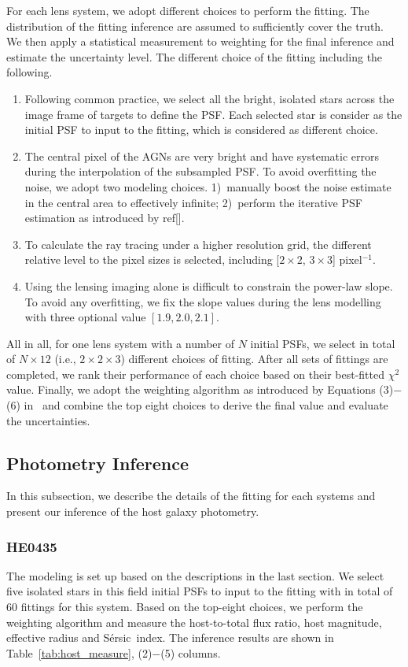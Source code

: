 \documentclass[fleqn,usenatbib]{mnras}
\newcommand{\sersic}{S\'ersic}
\begin{document}
For each lens system, we adopt different choices to perform the fitting. The distribution of the fitting inference are assumed to sufficiently cover the truth. We then apply a statistical measurement to weighting for the final inference and estimate the uncertainty level. The different choice of the fitting including the following.
\begin{enumerate}
\item Following common practice, we select all the bright, isolated stars across the image frame of targets to define the PSF. Each selected star is consider as the initial PSF to input to the fitting, which is considered as different choice.
\item The central pixel of the AGNs are very bright and have systematic errors during the interpolation of the subsampled PSF. To avoid overfitting the noise, we adopt two modeling choices. 1)~manually boost the noise estimate in the central area to effectively infinite; 2)~perform the iterative PSF estimation as introduced by ref[].
\item To calculate the ray tracing under a higher resolution grid, the different relative level to the pixel sizes is selected, including [$2\times2$, $3\times3$] pixel$^{-1}$.
\item Using the lensing imaging alone is difficult to constrain the power-law slope. To avoid any overfitting, we fix the slope values during the lens modelling with three optional value $[1.9, 2.0, 2.1]$.
\end{enumerate}

All in all, for one lens system with a number of $N$ initial PSFs, we select in total of $N\times12$ (i.e., $2 \times2 \times3$) different choices of fitting. After  all sets of fittings are completed, we rank their performance of each choice based on their best-fitted $\chi^2$ value. Finally, we adopt the weighting algorithm as introduced by Equations (3)$-$(6) in~\citet{Ding2020} and combine the top eight choices to derive the final value and evaluate the uncertainties.

\subsection{Photometry Inference}
In this subsection, we describe the details of the fitting for each systems and present our inference of the host galaxy photometry.

\subsubsection{HE0435}
The modeling is set up based on the descriptions in the last section. We select five isolated stars in this field initial PSFs to input to the fitting with in total of 60 fittings for this system. Based on the top-eight choices, we perform the weighting algorithm and measure the host-to-total flux ratio, host magnitude, effective radius and \sersic\ index. The inference results are shown in Table~\ref{tab:host_measure}, (2)$-$(5) columns.
\end{document}

